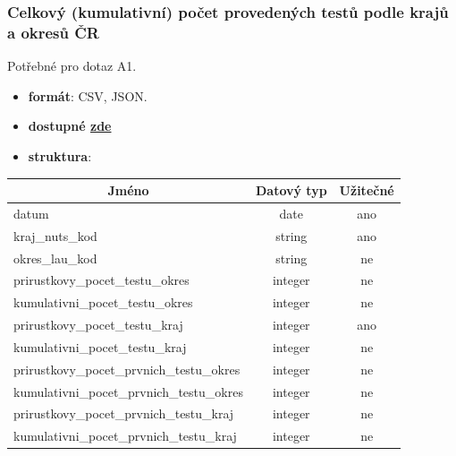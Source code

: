 \documentclass[12pt]{article}
\begin{document}
\subsubsection*{Celkový (kumulativní) počet provedených testů podle krajů a okresů ČR}
Potřebné pro dotaz A1.
\begin{itemize}
    \item \textbf{formát}: CSV, JSON.
    \item \textbf{dostupné  \href{https://onemocneni-aktualne.mzcr.cz/api/v2/covid-19/kraj-okres-testy.csv}{zde}}
    \item \textbf{struktura}:
\end{itemize}
        \begin{center}
            \begin{tabular}{ |l|c|c| } 
                \hline
                \multicolumn{1}{|c|}{Jméno} & Datový typ & Užitečné \\
                \hline
                \hline
                datum & date & ano \\ 
                \hline
                kraj\_nuts\_kod & string & ano \\ 
                \hline
                okres\_lau\_kod & string & ne \\ 
                \hline
                prirustkovy\_pocet\_testu\_okres & integer & ne \\ 
                \hline
                kumulativni\_pocet\_testu\_okres & integer & ne \\ 
                \hline
                prirustkovy\_pocet\_testu\_kraj & integer & ano \\ 
                \hline
                kumulativni\_pocet\_testu\_kraj & integer & ne \\ 
                \hline
                prirustkovy\_pocet\_prvnich\_testu\_okres & integer & ne \\ 
                \hline
                kumulativni\_pocet\_prvnich\_testu\_okres & integer & ne \\ 
                \hline
                prirustkovy\_pocet\_prvnich\_testu\_kraj & integer & ne \\ 
                \hline
                kumulativni\_pocet\_prvnich\_testu\_kraj & integer & ne \\ 
                \hline
            \end{tabular}
        \end{center}
\end{document}
